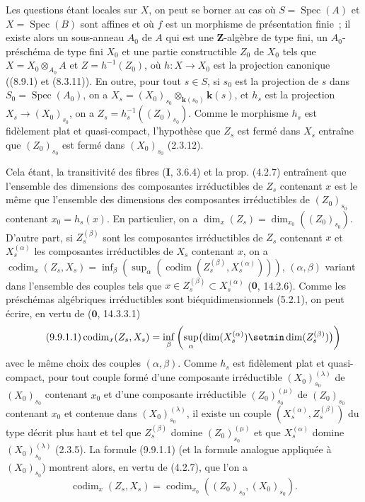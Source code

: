 Les questions étant locales sur $X$, on peut se borner au cas où
$S=\operatorname{Spec}(A)$ et $X=\operatorname{Spec}(B)$ sont affines et où
$f$ est un morphisme de présentation finie~; il existe alors un sous-anneau
$A_0$ de $A$ qui est une $\mathbf Z$-algèbre de type fini, un
$A_0$-préschéma de type fini $X_0$ et une partie constructible $Z_0$ de $X_0$
tels que $X=X_0\otimes_{A_0}A$ et $Z=h^{-1}(Z_0)$, où $h:X\to X_0$ est la
projection canonique ((8.9.1) et (8.3.11)). En outre, pour tout $s\in S$, si
$s_0$ est la projection de $s$ dans $S_0=\operatorname{Spec}(A_0)$, on a
$X_s=(X_0)_{s_0}\otimes_{\mathbf{k}(s_0)}\boldsymbol{k}(s)$,
et $h_s$ est la projection $X_s\to(X_0)_{s_0}$, on a
$Z_s=h_s^{-1}((Z_0)_{s_0})$. Comme le morphisme $h_s$ est fidèlement plat et
quasi-compact, l'hypothèse que $Z_s$ est fermé dans $X_s$ entraîne que
$(Z_0)_{s_0}$ est fermé dans $(X_0)_{s_0}$ (2.3.12).

Cela étant, la transitivité des fibres (\textbf{I}, 3.6.4) et la prop. (4.2.7)
entraînent que l'ensemble des dimensions des composantes irréductibles de
$Z_s$ contenant $x$ est le même que l'ensemble des dimensions des composantes
irréductibles de $(Z_0)_{s_0}$ contenant $x_0=h_s(x)$. En particulier, on a
$\dim_x(Z_s)=\dim_{x_0}((Z_0)_{s_0})$. D'autre part, si $Z_s^{(\beta)}$ sont les
composantes irréductibles de $Z_s$ contenant $x$ et $X_s^{(\alpha)}$ les
composantes irréductibles de $X_s$
contenant $x$, on a $\operatorname{codim}_x(Z_s,X_s)=
\inf_\beta(\sup_\alpha
(\operatorname{codim}(Z_s^{(\beta)},X_s^{(\alpha)})))$,
$(\alpha,\beta)$ variant dans l'ensemble des couples tels que
$x\in Z_s^{(\beta)}\subset X_s^{(\alpha)}$ ($\mathbf 0$, 14.2.6). Comme les
préschémas algébriques irréductibles sont biéquidimensionnels (5.2.1), on peut
écrire, en vertu de ($\mathbf 0$, 14.3.3.1)
\begin{equation}
\tag{9.9.1.1}
\label{IV.9.9.1.1-fr}
\operatorname{codim}_x(Z_s,X_s)=
\inf_\beta\left(\sup_\alpha
\bigl(\dim(X_s^{(\alpha)})\setmin\dim(Z_s^{(\beta)})\bigr)\right)
\end{equation}
avec le même choix des couples $(\alpha,\beta)$. Comme $h_s$ est fidèlement
plat et quasi-compact, pour tout couple formé d'une composante irréductible
$(X_0)_{s_0}^{(\lambda)}$ de $(X_0)_{s_0}$ contenant $x_0$ et d'une composante
irréductible $(Z_0)_{s_0}^{(\mu)}$ de $(Z_0)_{s_0}$ contenant $x_0$ et contenue
dans $(X_0)_{s_0}^{(\lambda)}$, il existe un couple
$(X_s^{(\alpha)},Z_s^{(\beta)})$ du type décrit plus haut et tel que
$Z_s^{(\beta)}$ domine $(Z_0)_{s_0}^{(\mu)}$ et que $X_s^{(\alpha)}$ domine
$(X_0)_{s_0}^{(\lambda)}$ (2.3.5). La formule (9.9.1.1) (et la formule analogue
appliquée à $(X_0)_{s_0}$) montrent alors, en vertu de (4.2.7), que l'on a
\[
\operatorname{codim}_x(Z_s,X_s)=
\operatorname{codim}_{x_0}((Z_0)_{s_0},(X_0)_{s_0}).
\]

